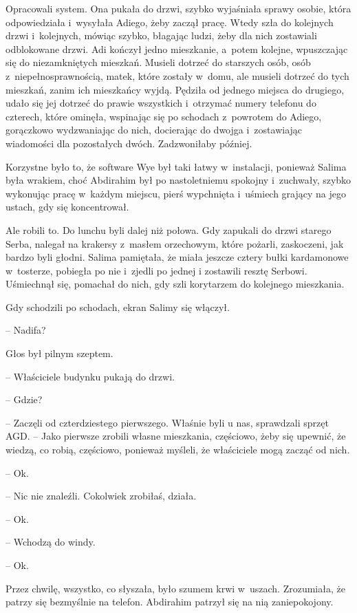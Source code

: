 \documentclass[oneside,polish,11pt,sfheadings]{mwbk}
\begin{document}
Opracowali system. Ona pukała do drzwi, szybko wyjaśniała sprawy osobie,
która odpowiedziała i~wysyłała Adiego, żeby zaczął pracę. Wtedy szła do
kolejnych drzwi i~kolejnych, mówiąc szybko, błagając ludzi, żeby dla
nich zostawiali odblokowane drzwi. Adi kończył jedno mieszkanie, a~potem
kolejne, wpuszczając się do niezamkniętych mieszkań. Musieli dotrzeć do
starszych osób, osób z~niepełnosprawnością, matek, które zostały w~domu,
ale musieli dotrzeć do tych mieszkań, zanim ich mieszkańcy wyjdą.
Pędziła od jednego miejsca do drugiego, udało się jej dotrzeć do prawie
wszystkich i~otrzymać numery telefonu do czterech, które ominęła,
wspinając się po schodach z~powrotem do Adiego, gorączkowo wydzwaniając
do nich, docierając do dwojga i~zostawiając wiadomości dla pozostałych
dwóch. Zadzwoniłaby później.

Korzystne było to, że software Wye był taki łatwy w~instalacji, ponieważ
Salima była wrakiem, choć Abdirahim był po nastoletniemu spokojny i~zuchwały, szybko wykonując pracę w~każdym miejscu, pierś wypchnięta i~uśmiech grający na jego ustach, gdy się koncentrował.

Ale robili to. Do lunchu byli dalej niż połowa. Gdy zapukali do drzwi
starego Serba, nalegał na krakersy z~masłem orzechowym, które pożarli,
zaskoczeni, jak bardzo byli głodni. Salima pamiętała, że miała jeszcze
cztery bułki kardamonowe w~tosterze, pobiegła po nie i~zjedli po jednej
i zostawili resztę Serbowi. Uśmiechnął się, pomachał do nich, gdy szli
korytarzem do kolejnego mieszkania.

Gdy schodzili po schodach, ekran Salimy się włączył.

-- Nadifa?

Głos był pilnym szeptem. 

-- Właściciele budynku pukają do drzwi.

-- Gdzie?

-- Zaczęli od czterdziestego pierwszego. Właśnie byli u nas, sprawdzali
sprzęt AGD. -- Jako pierwsze zrobili własne mieszkania, częściowo, żeby
się upewnić, że wiedzą, co robią, częściowo, ponieważ myśleli, że
właściciele mogą zacząć od nich.

-- Ok.

-- Nic nie znaleźli. Cokolwiek zrobiłaś, działa.

-- Ok.

-- Wchodzą do windy.

-- Ok.

Przez chwilę, wszystko, co słyszała, było szumem krwi w~uszach.
Zrozumiała, że patrzy się bezmyślnie na telefon. Abdirahim patrzył się
na nią zaniepokojony.
\end{document}
